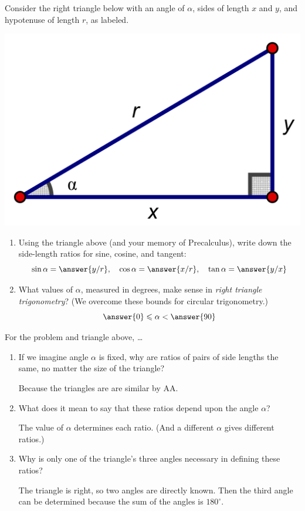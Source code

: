 \documentclass[nooutcomes]{ximera}
\begin{document}
\begin{problem}
Consider the right triangle below with an angle of $\alpha$, sides of length $x$ and $y$, and hypotenuse of length $r$, as labeled.  
\begin{image}
\includegraphics[scale=0.8]{rightTriangle.png}
\end{image}
\begin{enumerate}
\item Using the triangle above (and your memory of Precalculus), write down the side-length ratios for sine, cosine, and tangent:  
\[
\sin\alpha = \answer{y/r}, \quad
 \cos\alpha = \answer{x/r}, \quad
  \tan\alpha = \answer{y/x}
\]
\item What values of $\alpha$, measured in degrees, make sense in \emph{right triangle trigonometry}?  (We overcome these bounds for circular trigonometry.)
\[
\answer{0} \le \alpha < \answer{90}
\]  
\end{enumerate}
\end{problem}

\begin{problem}
For the problem and triangle above, \dots
\begin{enumerate}
\item If we imagine angle $\alpha$ is fixed, why are ratios of pairs of side lengths the same, no matter the size of the triangle?
  \begin{hint}Because the triangles are are similar by AA.  \end{hint}
\item What does it mean to say that these ratios depend upon the angle $\alpha$?  
  \begin{hint}The value of $\alpha$ determines each ratio.  (And a different $\alpha$ gives different ratios.)\end{hint}
\item Why is only one of the triangle's three angles necessary in defining these ratios?  
  \begin{hint}The triangle is right, so two angles are directly known.  Then the third angle can be determined because the sum of the angles is $180^\circ$.\end{hint}  
\end{enumerate}
\begin{freeResponse}
\end{freeResponse}
\end{problem}
\end{document}
